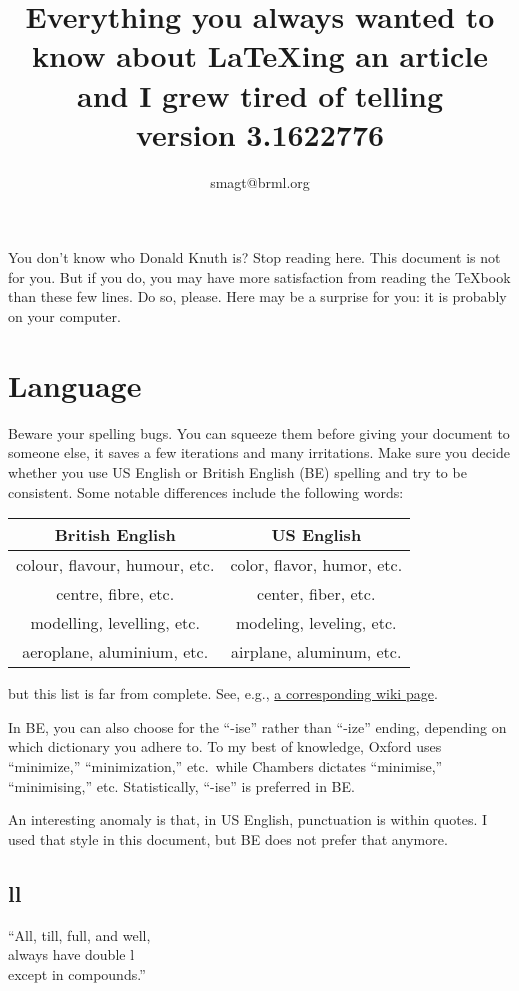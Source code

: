 \documentclass{article}
\title{Everything you always wanted to know about \LaTeX ing an article 
and I grew tired of telling\\[1ex]
\footnotesize{version 3.1622776}}
\author{smagt@brml.org}
\begin{document}
\maketitle

You don't know who Donald Knuth is?  Stop reading here.  This document is 
not for you.  But if you do, you may have more satisfaction from reading 
the \TeX book than these few lines.   Do so, please. Here may be a surprise for you: it is probably on your computer.

\section{Language}
Beware your spelling bugs.  You can squeeze them before giving your document to someone else, it saves a few iterations and many irritations.  Make sure you decide whether you use US English or British English (BE) spelling and try to be consistent.
Some notable differences include the following words:
\begin{center}\begin{tabular}{c|c}
British English & US English \\\hline
colour, flavour, humour, etc.	& color, flavor, humor, etc.\\
centre, fibre, etc.	& center, fiber, etc.\\
modelling, levelling, etc.		& modeling, leveling, etc.\\
aeroplane, aluminium, etc.			& airplane, aluminum, etc.
\end{tabular}\end{center}
but this list is far from complete.  See, e.g., \href{http://en.wikipedia.org/wiki/American_and_British_English_spelling_differences}{a corresponding wiki page}.

In BE, you can also choose for the ``-ise'' rather than ``-ize'' ending, depending on which dictionary you adhere to.  To my best of knowledge, Oxford uses ``minimize,'' ``minimization,'' etc.\ while Chambers dictates ``minimise,'' ``minimising,'' etc.  Statistically, ``-ise'' is preferred in BE.

An interesting anomaly is that, in US English, punctuation is within quotes.   I used that style in this document, but BE does not prefer that anymore.


\subsection{ll}
``All, till, full, and well, \\
always have double l\\
except in compounds.''
\end{document}
